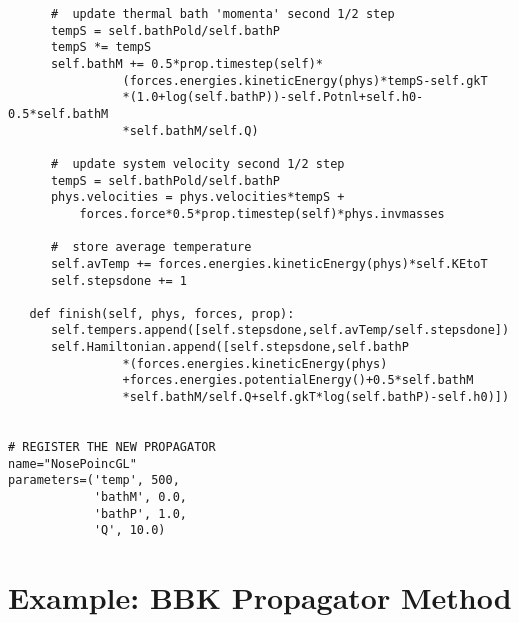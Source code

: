 \documentclass[11pt]{report}
\begin{document}
\begin{verbatim}
      #  update thermal bath 'momenta' second 1/2 step
      tempS = self.bathPold/self.bathP
      tempS *= tempS
      self.bathM += 0.5*prop.timestep(self)*
                (forces.energies.kineticEnergy(phys)*tempS-self.gkT
                *(1.0+log(self.bathP))-self.Potnl+self.h0-0.5*self.bathM
                *self.bathM/self.Q)

      #  update system velocity second 1/2 step
      tempS = self.bathPold/self.bathP
      phys.velocities = phys.velocities*tempS + 
          forces.force*0.5*prop.timestep(self)*phys.invmasses

      #  store average temperature
      self.avTemp += forces.energies.kineticEnergy(phys)*self.KEtoT
      self.stepsdone += 1

   def finish(self, phys, forces, prop):
      self.tempers.append([self.stepsdone,self.avTemp/self.stepsdone])
      self.Hamiltonian.append([self.stepsdone,self.bathP
                *(forces.energies.kineticEnergy(phys)
                +forces.energies.potentialEnergy()+0.5*self.bathM
                *self.bathM/self.Q+self.gkT*log(self.bathP)-self.h0)])
      

# REGISTER THE NEW PROPAGATOR      
name="NosePoincGL"
parameters=('temp', 500,
            'bathM', 0.0,
            'bathP', 1.0,
            'Q', 10.0)

\end{verbatim}


\newpage
\section{Example: BBK Propagator Method}
\end{document}
